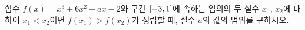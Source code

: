함수 $f(x)=x^3+6x^2+ax-2$와 구간 $[-3{,}\mkern3mu\mathopen{}1]$에 속하는 임의의 두 실수 $x_1$, $x_2$에 대하여 $x_1<x_2$이면 $f(x_1)>f(x_2)$가 성립할 때, 실수 $a$의 값의 범위를 구하시오.
